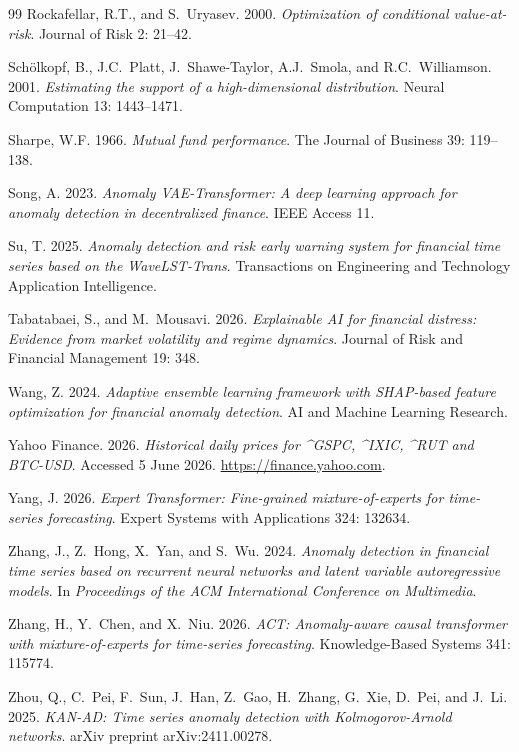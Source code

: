 \documentclass[]{interact}
\begin{document}
\begin{thebibliography}{99}
Rockafellar, R.T., and S.~Uryasev. 2000. \emph{Optimization of conditional value-at-risk}. Journal of Risk 2: 21--42.

Sch\"{o}lkopf, B., J.C.~Platt, J.~Shawe-Taylor, A.J.~Smola, and R.C.~Williamson. 2001. \emph{Estimating the support of a high-dimensional distribution}. Neural Computation 13: 1443--1471.

Sharpe, W.F. 1966. \emph{Mutual fund performance}. The Journal of Business 39: 119--138.

Song, A. 2023. \emph{Anomaly VAE-Transformer: A deep learning approach for anomaly detection in decentralized finance}. IEEE Access 11.

Su, T. 2025. \emph{Anomaly detection and risk early warning system for financial time series based on the WaveLST-Trans}. Transactions on Engineering and Technology Application Intelligence.

Tabatabaei, S., and M.~Mousavi. 2026. \emph{Explainable AI for financial distress: Evidence from market volatility and regime dynamics}. Journal of Risk and Financial Management 19: 348. 

Wang, Z. 2024. \emph{Adaptive ensemble learning framework with SHAP-based feature optimization for financial anomaly detection}. AI and Machine Learning Research.

Yahoo Finance. 2026. \emph{Historical daily prices for \^{}GSPC, \^{}IXIC, \^{}RUT and BTC-USD}. Accessed 5 June 2026. \url{https://finance.yahoo.com}.

Yang, J. 2026. \emph{Expert Transformer: Fine-grained mixture-of-experts for time-series forecasting}. Expert Systems with Applications 324: 132634. 

Zhang, J., Z.~Hong, X.~Yan, and S.~Wu. 2024. \emph{Anomaly detection in financial time series based on recurrent neural networks and latent variable autoregressive models}. In \emph{Proceedings of the ACM International Conference on Multimedia}.

Zhang, H., Y.~Chen, and X.~Niu. 2026. \emph{ACT: Anomaly-aware causal transformer with mixture-of-experts for time-series forecasting}. Knowledge-Based Systems 341: 115774. 

Zhou, Q., C.~Pei, F.~Sun, J.~Han, Z.~Gao, H.~Zhang, G.~Xie, D.~Pei, and J.~Li. 2025. \emph{KAN-AD: Time series anomaly detection with Kolmogorov-Arnold networks}. arXiv preprint arXiv:2411.00278.

\end{thebibliography}
\end{document}
